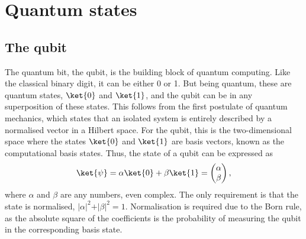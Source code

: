 \section{Quantum states}
\subsection{The qubit}
The quantum bit, the qubit, is the building block of quantum computing.
Like the classical binary digit, it can be either 0 or 1.
But being quantum, these are quantum states, $\ket{0}$ and $\ket{1}$\footnotemark[1]{}, and the qubit can be in any superposition of these states.
This follows from the first postulate of quantum mechanics\footnotemark[2], which states that an isolated system is entirely described by a normalised vector in a Hilbert space.
For the qubit, this is the two-dimensional space where the states $\ket{0}$ and $\ket{1}$ are basis vectors, known as the computational basis states.
Thus, the state of a qubit can be expressed as
\begin{equation}
    \ket{\psi} = \alpha \ket{0} + \beta \ket{1} = \begin{pmatrix} \alpha \\ \beta \end{pmatrix},
    \label{eq:qubit}
\end{equation}
where $\alpha$ and $\beta$ are any numbers, even complex.
The only requirement is that the state is normalised, $\vert\alpha\vert^2 + \vert\beta\vert^2 = 1$.
Normalisation is required due to the Born rule, as the absolute square of the coefficients is the probability of measuring the qubit in the corresponding basis state.



